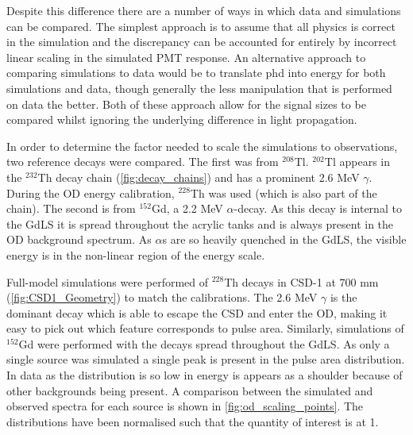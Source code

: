 

\par
Despite this difference there are a number of ways in which data and simulations can be compared.
The simplest approach is to assume that all physics is correct in the simulation and the discrepancy can be accounted for entirely by incorrect linear scaling in the simulated PMT response.
An alternative approach to comparing simulations to data would be to translate phd into energy for both simulations and data, though generally the less manipulation that is performed on data the better.
Both of these approach allow for the signal sizes to be compared whilst ignoring the underlying difference in light propagation.

\par
In order to determine the factor needed to scale the simulations to observations, two reference decays were compared.
The first was from ${}^{208}$Tl.
${}^{202}$Tl appears in the ${}^{232}$Th decay chain (\autoref{fig:decay_chains}) and has a prominent 2.6 MeV $\gamma$.
During the OD energy calibration, ${}^{228}$Th was used (which is also part of the chain).
The second is from ${}^{152}$Gd, a 2.2 MeV $\alpha$-decay.
As this decay is internal to the GdLS it is spread throughout the acrylic tanks and is always present in the OD background spectrum.
As $\alpha$s are so heavily quenched in the GdLS, the visible energy is in the non-linear region of the energy scale.

\par
Full-model simulations were performed of ${}^{228}$Th decays in CSD-1 at 700 mm (\autoref{fig:CSD1_Geometry}) to match the calibrations.
The 2.6 MeV $\gamma$ is the dominant decay which is able to escape the CSD and enter the OD, making it easy to pick out which feature corresponds to pulse area.
Similarly, simulations of ${}^{152}$Gd were performed with the decays spread throughout the GdLS.
As only a single source was simulated a single peak is present in the pulse area distribution.
In data as the distribution is so low in energy is appears as a shoulder because of other backgrounds being present.
A comparison between the simulated and observed spectra for each source is shown in \autoref{fig:od_scaling_points}.
The distributions have been normalised such that the quantity of interest is at 1.

